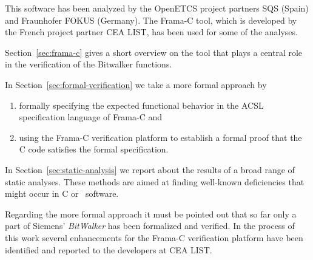This software has been analyzed by the OpenETCS project partners SQS (Spain)
and Fraunhofer FOKUS (Germany).
The Frama-C tool, which is developed by the French project partner {CEA LIST},
has been used for some of the analyses.

Section~\ref{sec:frama-c} gives a short overview on the \framacwp tool
that plays a central role in the verification of the Bitwalker functions.

In Section~\ref{sec:formal-verification} we take a more formal approach by 
\begin{enumerate}
\item formally specifying the expected functional behavior in the ACSL specification language of {Frama-C}
      and
\item using the {Frama-C} verification platform to establish a formal proof that the C code
      satisfies the formal specification.
\end{enumerate}

In Section~\ref{sec:static-analysis} we report about the results of a broad range
of static analyses. 
These methods are aimed at finding well-known deficiencies that might occur in C or \CC\ software.

Regarding the more formal approach it must be pointed out that so far only a 
part of Siemens' \emph{BitWalker} has been formalized and verified.
In the process of this work several enhancements for the Frama-C verification platform have 
been identified and reported to the developers at {CEA LIST}.




